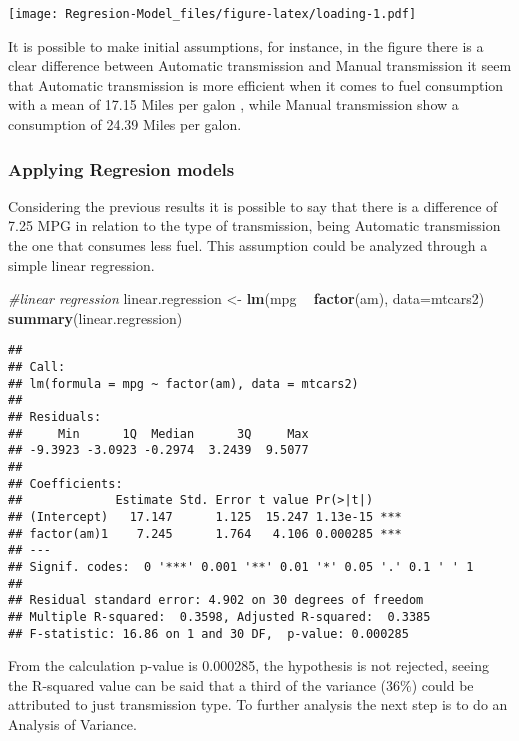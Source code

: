 \documentclass[
]{article}
\newenvironment{Shaded}{\begin{snugshade}}{\end{snugshade}}
\newcommand{\CommentTok}[1]{\textcolor[rgb]{0.56,0.35,0.01}{\textit{#1}}}
\newcommand{\DataTypeTok}[1]{\textcolor[rgb]{0.13,0.29,0.53}{#1}}
\newcommand{\KeywordTok}[1]{\textcolor[rgb]{0.13,0.29,0.53}{\textbf{#1}}}
\newcommand{\NormalTok}[1]{#1}
\newcommand{\OperatorTok}[1]{\textcolor[rgb]{0.81,0.36,0.00}{\textbf{#1}}}
\newcommand{\StringTok}[1]{\textcolor[rgb]{0.31,0.60,0.02}{#1}}
\begin{document}
\texttt{[image: Regresion-Model\_files/figure-latex/loading-1.pdf]}

It is possible to make initial assumptions, for instance, in the figure
there is a clear difference between Automatic transmission and Manual
transmission it seem that Automatic transmission is more efficient when
it comes to fuel consumption with a mean of 17.15 Miles per galon ,
while Manual transmission show a consumption of 24.39 Miles per galon.

\hypertarget{applying-regresion-models}{%
\subsubsection{Applying Regresion
models}\label{applying-regresion-models}}

Considering the previous results it is possible to say that there is a
difference of 7.25 MPG in relation to the type of transmission, being
Automatic transmission the one that consumes less fuel. This assumption
could be analyzed through a simple linear regression.

\begin{Shaded}
\begin{Highlighting}[]
\CommentTok{#linear regression}
\NormalTok{linear.regression <-}\StringTok{ }\KeywordTok{lm}\NormalTok{(mpg }\OperatorTok{~}\StringTok{ }\KeywordTok{factor}\NormalTok{(am), }\DataTypeTok{data=}\NormalTok{mtcars2)}
\KeywordTok{summary}\NormalTok{(linear.regression)}
\end{Highlighting}
\end{Shaded}

\begin{verbatim}
## 
## Call:
## lm(formula = mpg ~ factor(am), data = mtcars2)
## 
## Residuals:
##     Min      1Q  Median      3Q     Max 
## -9.3923 -3.0923 -0.2974  3.2439  9.5077 
## 
## Coefficients:
##             Estimate Std. Error t value Pr(>|t|)    
## (Intercept)   17.147      1.125  15.247 1.13e-15 ***
## factor(am)1    7.245      1.764   4.106 0.000285 ***
## ---
## Signif. codes:  0 '***' 0.001 '**' 0.01 '*' 0.05 '.' 0.1 ' ' 1
## 
## Residual standard error: 4.902 on 30 degrees of freedom
## Multiple R-squared:  0.3598, Adjusted R-squared:  0.3385 
## F-statistic: 16.86 on 1 and 30 DF,  p-value: 0.000285
\end{verbatim}

From the calculation p-value is 0.000285, the hypothesis is not
rejected, seeing the R-squared value can be said that a third of the
variance (36\%) could be attributed to just transmission type. To
further analysis the next step is to do an Analysis of Variance.
\end{document}
